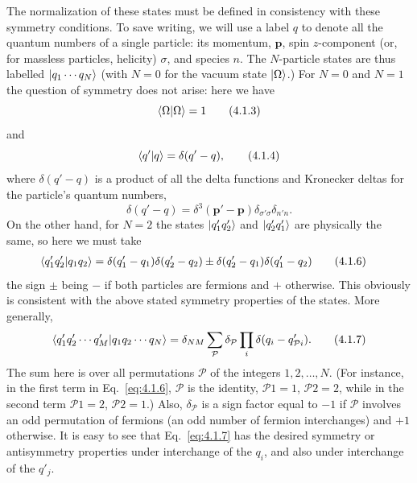 The normalization of these states must be defined in consistency with
these symmetry conditions. To save writing, we will use a label $q$ to
denote all the quantum numbers of a single particle: its momentum, $\mathbf p$,
spin $z$-component (or, for massless particles, helicity) $\sigma$, and species $n$. The
$N$-particle states are thus labelled $\lvert q_1\cdots q_N\rangle$ (with $N=0$ for the vacuum
state $\lvert \Omega\rangle$.) For $N=0$ and $N=1$ the question of symmetry does not arise:
here we have
\begin{equation}
  \langle \Omega | \Omega\rangle=1
  \tag{4.1.3}
  \label{eq:4.1.3}
\end{equation}
and
\begin{equation}
  \langle q' | q\rangle=\delta(q'-q),
  \tag{4.1.4}
  \label{eq:4.1.4}
\end{equation}
where $\delta(q'-q)$ is a product of all the delta functions and Kronecker deltas
for the particle's quantum numbers,
\begin{equation}
  \delta(q'-q)=\delta^3(\mathbf p'-\mathbf p)\delta_{\sigma'\sigma}\delta_{n'n}.
  \tag{4.1.5}
  \label{eq:4.1.5}
\end{equation}
On the other hand, for $N=2$ the states $\lvert q'_1q'_2\rangle$ and $\lvert q'_2q'_1\rangle$ are physically the
same, so here we must take
\begin{align}
  \langle q'_1q'_2 | q_1q_2\rangle
  ={}& \delta(q'_1-q_1)\delta(q'_2-q_2)
  \pm \delta(q'_2-q_1)\delta(q'_1-q_2)
  \tag{4.1.6}
  \label{eq:4.1.6}
\end{align}
the sign $\pm$ being $-$ if both particles are fermions and $+$ otherwise. This
obviously is consistent with the above stated symmetry properties of the
states. More generally,
\begin{equation}
  \langle q'_1q'_2\cdots q'_M | q_1q_2\cdots q_N\rangle
  = \delta_{NM}\sum_{\mathcal P}\delta_{\mathcal P}
    \prod_i\delta(q_i-q'_{\mathcal P i}).
  \tag{4.1.7}
  \label{eq:4.1.7}
\end{equation}
The sum here is over all permutations $\mathcal P$ of the integers $1,2,\ldots,N$. (For
instance, in the first term in Eq.~\eqref{eq:4.1.6}, $\mathcal P$ is the identity, $\mathcal P1=1$, $\mathcal P2=2$,
while in the second term $\mathcal P1=2$, $\mathcal P2=1$.) Also, $\delta_{\mathcal P}$ is a sign factor equal
to $-1$ if $\mathcal P$ involves an odd permutation of fermions (an odd number of
fermion interchanges) and $+1$ otherwise. It is easy to see that Eq.~\eqref{eq:4.1.7}
has the desired symmetry or antisymmetry properties under interchange
of the $q_i$, and also under interchange of the $q'_j$.
